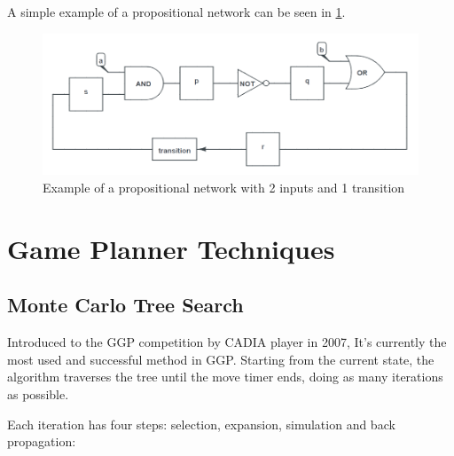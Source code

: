 A simple example of a propositional network can be seen in \ref{fig:propnets example}.

\begin{figure}[h]
	\centering
    \includegraphics[scale=0.45]{images/propnets_example.png}
    \caption{Example of a propositional network with 2 inputs and 1 transition}
    \label{fig:propnets example}
\end{figure}


\section{Game Planner Techniques}
\subsection{Monte Carlo Tree Search}
Introduced to the GGP competition by CADIA player in 2007, It’s currently the most used and successful method in GGP. Starting from the current state, the algorithm traverses the tree until the move timer ends, doing as many iterations as possible.

Each iteration has four steps: selection, expansion, simulation and back propagation:


